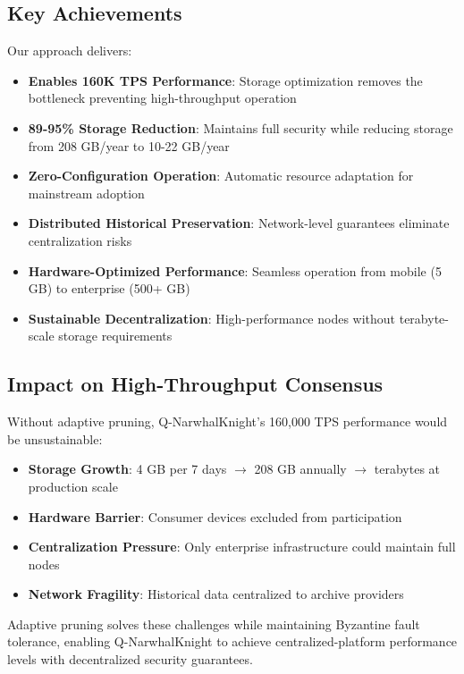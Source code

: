\documentclass[11pt,a4paper]{article}
\begin{document}
\subsection{Key Achievements}

Our approach delivers:

\begin{itemize}
\item \textbf{Enables 160K TPS Performance}: Storage optimization removes the bottleneck preventing high-throughput operation
\item \textbf{89-95\% Storage Reduction}: Maintains full security while reducing storage from 208 GB/year to 10-22 GB/year
\item \textbf{Zero-Configuration Operation}: Automatic resource adaptation for mainstream adoption
\item \textbf{Distributed Historical Preservation}: Network-level guarantees eliminate centralization risks
\item \textbf{Hardware-Optimized Performance}: Seamless operation from mobile (5 GB) to enterprise (500+ GB)
\item \textbf{Sustainable Decentralization}: High-performance nodes without terabyte-scale storage requirements
\end{itemize}

\subsection{Impact on High-Throughput Consensus}

Without adaptive pruning, Q-NarwhalKnight's 160,000 TPS performance would be unsustainable:

\begin{itemize}
\item \textbf{Storage Growth}: 4 GB per 7 days $\rightarrow$ 208 GB annually $\rightarrow$ terabytes at production scale
\item \textbf{Hardware Barrier}: Consumer devices excluded from participation
\item \textbf{Centralization Pressure}: Only enterprise infrastructure could maintain full nodes
\item \textbf{Network Fragility}: Historical data centralized to archive providers
\end{itemize}

Adaptive pruning solves these challenges while maintaining Byzantine fault tolerance, enabling Q-NarwhalKnight to achieve centralized-platform performance levels with decentralized security guarantees.
\end{document}
